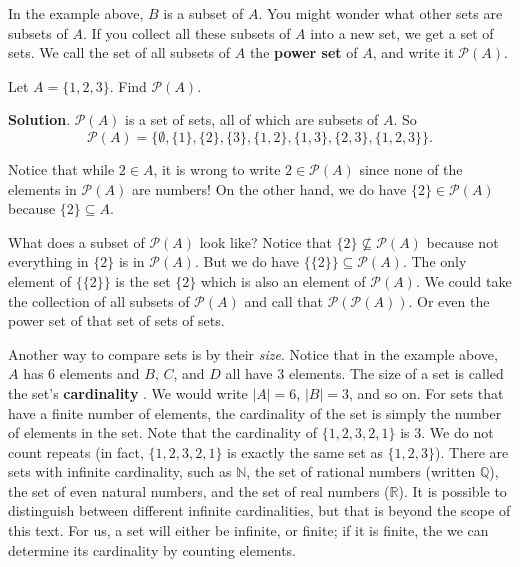 \documentclass[11pt,]{book}
\newcommand{\terminology}[1]{\textbf{#1}}
\theoremstyle{ptxplainnotitle}
\theoremstyle{ptxplaintitle}
\theoremstyle{ptxdefinitionnotitle}
\theoremstyle{ptxdefinitiontitle}
\theoremstyle{ptxdefinitionnotitle}
\theoremstyle{ptxdefinitiontitle}
\theoremstyle{ptxdefinitionnotitle}
\theoremstyle{ptxdefinitiontitle}
\theoremstyle{ptxdefinitiontitlenonumber}
\theoremstyle{ptxdefinitiontitlenonumber}
\numberwithin{equation}{chapter}
\newcommand{\N}{\mathbb N}
\newcommand{\pow}{\mathcal P}
\begin{document}
\hypertarget{p-766}{}%
In the example above, \(B\) is a subset of \(A\). You might wonder what other sets are subsets of \(A\). If you collect all these subsets of \(A\) into a new set, we get a set of sets. We call the set of all subsets of \(A\) the \terminology{power set}  of \(A\), and write it \(\pow(A)\).%
\begin{example}\label{example-30}
\hypertarget{p-767}{}%
Let \(A = \{1,2,3\}\). Find \(\pow(A)\).%
\par\smallskip%
\noindent\textbf{Solution}.\hypertarget{solution-102}{}\quad%
\hypertarget{p-768}{}%
\(\pow(A)\) is a set of sets, all of which are subsets of \(A\). So%
\begin{equation*}
\pow(A) = \{ \emptyset, \{1\}, \{2\}, \{3\}, \{1,2\}, \{1, 3\}, \{2,3\}, \{1,2,3\}\}.
\end{equation*}
%
\par
\hypertarget{p-769}{}%
Notice that while \(2 \in A\), it is wrong to write \(2 \in \pow(A)\) since none of the elements in \(\pow(A)\) are numbers! On the other hand, we do have \(\{2\} \in \pow(A)\) because \(\{2\} \subseteq A\).%
\par
\hypertarget{p-770}{}%
What does a subset of \(\pow(A)\) look like? Notice that \(\{2\} \not\subseteq \pow(A)\) because not everything in \(\{2\}\) is in \(\pow(A)\). But we do have \(\{ \{2\} \} \subseteq \pow(A)\). The only element of \(\{\{2\}\}\) is the set \(\{2\}\) which is also an element of \(\pow(A)\). We could take the collection of all subsets of \(\pow(A)\) and call that \(\pow(\pow(A))\). Or even the power set of that set of sets of sets.%
\end{example}
\hypertarget{p-771}{}%
Another way to compare sets is by their \emph{size}. Notice that in the example above, \(A\) has 6 elements and \(B\), \(C\), and \(D\) all have 3 elements. The size of a set is called the set's \terminology{cardinality} . We would write \(|A| = 6\), \(|B| = 3\), and so on. For sets that have a finite number of elements, the cardinality of the set is simply the number of elements in the set. Note that the cardinality of \(\{ 1, 2, 3, 2, 1\}\) is 3. We do not count repeats (in fact, \(\{1, 2, 3, 2, 1\}\) is exactly the same set as \(\{1, 2, 3\}\)). There are sets with infinite cardinality, such as \(\N\), the set of rational numbers (written \(\mathbb Q\)), the set of even natural numbers, and the set of real numbers (\(\mathbb R\)). It is possible to distinguish between different infinite cardinalities, but that is beyond the scope of this text. For us, a set will either be infinite, or finite; if it is finite, the we can determine its cardinality by counting elements.%
\end{document}

